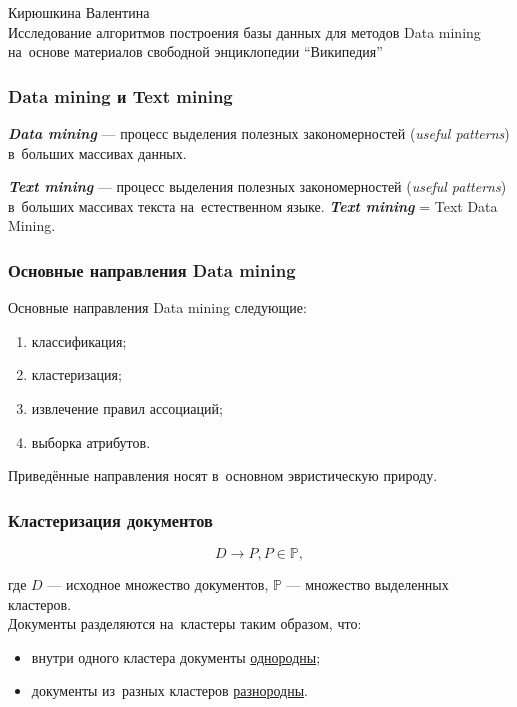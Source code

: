 \documentclass{beamer}
\newcommand{\MARK}[1]{{\bf {\it #1}}}
\begin{document}
\sloppy

\begin{frame}
\begin{center}
Кирюшкина Валентина\\
\vspace{1cm}
{\Large Исследование алгоритмов построения базы данных для методов Data mining\\
на~основе материалов свободной энциклопедии ``Википедия''}
\end{center}
\end{frame}

\begin{frame}
\frametitle{Data mining и Text mining}
\MARK{Data mining} --- процесс выделения полезных закономерностей ({\it useful patterns})  
в~больших массивах данных.

\vspace{1cm}

\MARK{Text mining} --- процесс выделения полезных закономерностей ({\it useful patterns})  
в~больших массивах текста на~естественном языке.
\MARK{Text mining} = Text Data Mining.
\end{frame}

\begin{frame}
\frametitle{Основные направления Data mining}

Основные направления Data mining следующие:

\begin{enumerate}
\item{классификация;}
\item{кластеризация;}
\item{извлечение правил ассоциаций;}
\item{выборка атрибутов.}
\end{enumerate}

Приведённые направления носят в~основном эвристическую природу.
\end{frame}

\begin{frame}
\frametitle{Кластеризация документов}
$$D \to P, P \in \mathbb{P},$$

\vspace{1cm}

где $D$ --- исходное множество документов, $\mathbb{P}$ --- множество выделенных кластеров.\\
Документы разделяются на~кластеры таким образом, что:

\begin{itemize}
\item{внутри одного кластера документы \underline{однородны};}
\item{документы из~разных кластеров \underline{разнородны}.}
\end{itemize}
\vspace{1cm}
\end{frame}
\end{document}
